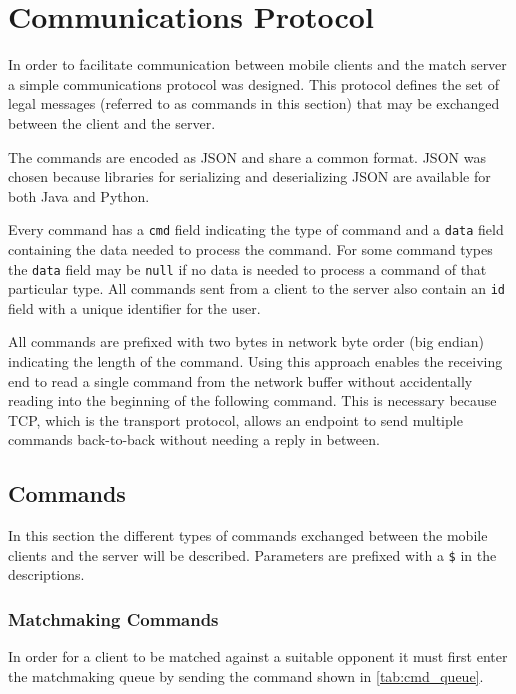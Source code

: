 \section{Communications Protocol}
\label{sec:com_protocol}
In order to facilitate communication between mobile clients and the match server a simple communications protocol was designed.
This protocol defines the set of legal messages (referred to as commands in this section) that may be exchanged between the client and the server.

The commands are encoded as \ac{JSON} and share a common format.
\ac{JSON} was chosen because libraries for serializing and deserializing \ac{JSON} are available for both Java and Python.

Every command has a \texttt{cmd} field indicating the type of command and a \texttt{data} field containing the data needed to process the command.
For some command types the \texttt{data} field may be \texttt{null} if no data is needed to process a command of that particular type.
All commands sent from a client to the server also contain an \texttt{id} field with a unique identifier for the user.

All commands are prefixed with two bytes in network byte order (big endian) indicating the length of the command.
Using this approach enables the receiving end to read a single command from the network buffer without accidentally reading into the beginning of the following command.
This is necessary because \ac{TCP}, which is the transport protocol, allows an endpoint to send multiple commands back-to-back without needing a reply in between.

\subsection{Commands}
In this section the different types of commands exchanged between the mobile clients and the server will be described.
Parameters are prefixed with a \texttt{\$} in the descriptions.

\subsubsection{Matchmaking Commands}
In order for a client to be matched against a suitable opponent it must first enter the matchmaking queue by sending the command shown in \autoref{tab:cmd_queue}.

\newenvironment{command}
{\bigskip\begin{minipage}{\textwidth}\hrule\begin{description}}
{\end{description}\hrule\end{minipage}\bigskip}

